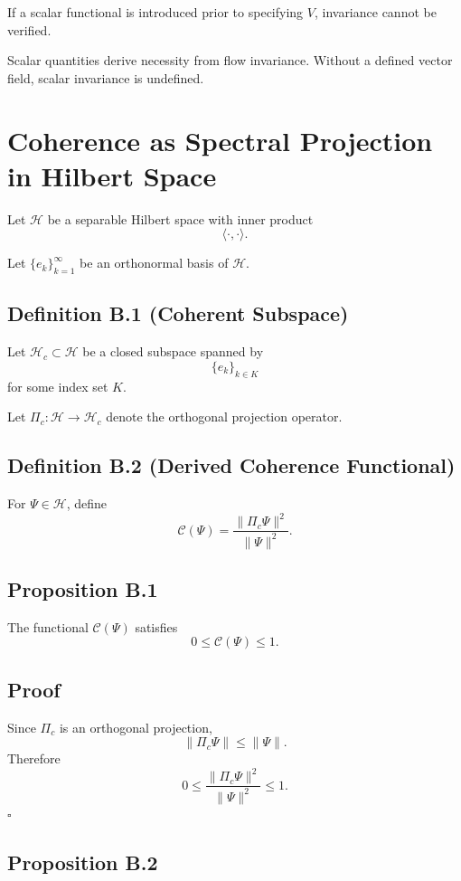 \documentclass[12pt]{article}
\begin{document}
If a scalar functional is introduced prior to specifying $V$, invariance cannot be verified.

Scalar quantities derive necessity from flow invariance. Without a defined vector field, scalar invariance is undefined.

\section{Coherence as Spectral Projection in Hilbert Space}

Let $\mathcal{H}$ be a separable Hilbert space with inner product 
\[
\langle \cdot , \cdot \rangle.
\]

Let $\{e_k\}_{k=1}^{\infty}$ be an orthonormal basis of $\mathcal{H}$.

\subsection*{Definition B.1 (Coherent Subspace)}

Let $\mathcal{H}_c \subset \mathcal{H}$ be a closed subspace spanned by 
\[
\{e_k\}_{k \in K}
\]
for some index set $K$.

Let $\Pi_c : \mathcal{H} \to \mathcal{H}_c$ denote the orthogonal projection operator.

\subsection*{Definition B.2 (Derived Coherence Functional)}

For $\Psi \in \mathcal{H}$, define
\[
\mathcal{C}(\Psi)
=
\frac{\|\Pi_c \Psi\|^2}{\|\Psi\|^2}.
\]

\subsection*{Proposition B.1}

The functional $\mathcal{C}(\Psi)$ satisfies
\[
0 \le \mathcal{C}(\Psi) \le 1.
\]

\subsection*{Proof}

Since $\Pi_c$ is an orthogonal projection,
\[
\|\Pi_c \Psi\| \le \|\Psi\|.
\]
Therefore
\[
0 \le \frac{\|\Pi_c \Psi\|^2}{\|\Psi\|^2} \le 1.
\]
\hfill $\square$

\subsection*{Proposition B.2}
\end{document}
